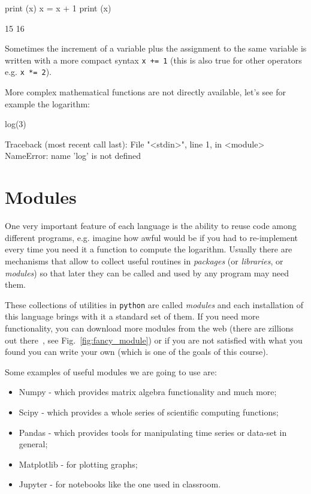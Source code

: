 \begin{ipythonnon}
print (x)
x = x + 1
print (x)	
\end{ipythonnon}
\begin{ioutput}
15
16
\end{ioutput}

Sometimes the increment of a variable plus the assignment to the same variable is written with a more compact syntax \texttt{x += 1} (this is also true for other operators e.g. \texttt{x *= 2}).

More complex mathematical functions are not directly available, let's see for example the logarithm:

\begin{ipythonnon}
log(3)
\end{ipythonnon}
\begin{ioutput}
Traceback (most recent call last):
  File "<stdin>", line 1, in <module>
NameError: name 'log' is not defined
\end{ioutput}

\section{Modules}\label{modules}

One very important feature of each language is the ability to reuse code among different programs, e.g. imagine how awful would be if you had to re-implement every time you need it a function to compute the logarithm.
Usually there are mechanisms that allow to collect useful routines in \emph{packages} (or \emph{libraries}, or \emph{modules}) so that later they can be called and used by any program may need them.

These collections of utilities in \texttt{python} are called \emph{modules} and each installation of this language brings with it a standard set of them. If you need more functionality, you can download more modules from the web (there are zillions out there~\cite{modules}, see Fig.~\ref{fig:fancy_module}) or if you are not satisfied with what you found you can write your own (which is one of the goals of this course).

Some examples of useful modules we are going to use are:

\begin{itemize}
\tightlist
\item Numpy - which provides matrix algebra functionality and much more;
\item Scipy - which provides a whole series of scientific computing
  functions;
\item Pandas - which provides tools for manipulating time series or data-set
  in general;
\item Matplotlib - for plotting graphs;
\item Jupyter - for notebooks like the one used in classroom.
\end{itemize}

